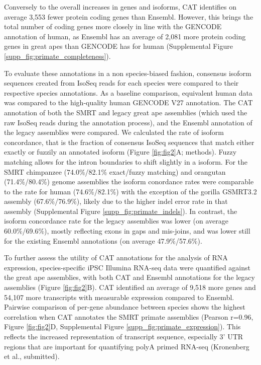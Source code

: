 \documentclass[fleqn,10pt]{wlscirep}
\begin{document}
Conversely to the overall increases in genes and isoforms, CAT identifies on average 3,553 fewer protein coding genes than Ensembl. However, this brings the total number of coding genes more closely in line with the GENCODE annotation of human, as Ensembl has an average of 2,081 more protein coding genes in great apes than GENCODE has for human (Supplemental Figure \ref{supp_fig:primate_completeness}). 

To evaluate these annotations in a non species-biased fashion, consensus isoform sequences created from IsoSeq reads for each species were compared to their respective species annotations. As a baseline comparison, equivalent human data was compared to the high-quality human GENCODE V27 annotation. The CAT annotation of both the SMRT and legacy great ape assemblies (which used the raw IsoSeq reads during the annotation process), and the Ensembl annotation of the legacy assemblies were compared. We calculated the rate of isoform concordance, that is the fraction of consensus IsoSeq sequences that match either exactly or fuzzily an annotated isoform (Figure \ref{fig:fig2}A; methods). Fuzzy matching allows for the intron boundaries to shift slightly in a isoform. For the SMRT chimpanzee (74.0\%/82.1\% exact/fuzzy matching) and orangutan (71.4\%/80.4\%) genome assemblies the isoform conordance rates were comparable to the rate for human (74.6\%/82.1\%) with the exception of the gorilla GSMRT3.2 assembly (67.6\%/76.9\%), likely due to the higher indel error rate in that assembly (Supplemental Figure \ref{supp_fig:primate_indels}). In contrast, the isoform concordance rate for the legacy assemblies was lower (on average 60.0\%/69.6\%), mostly reflecting exons in gaps and mis-joins, and was lower still for the existing Ensembl annotations (on average 47.9\%/57.6\%).

To further assess the utility of CAT annotations for the analysis of RNA expression, species-specific iPSC Illumina RNA-seq data were quantified against the great ape assemblies, with both CAT and Ensembl annotations for the legacy assemblies (Figure \ref{fig:fig2}B). CAT identified an average of 9,518 more genes and 54,107 more transcripts with measurable expression compared to Ensembl. Pairwise comparison of per-gene abundance between species shows the highest correlation when CAT annotates the SMRT primate assemblies (Pearson r=0.96, Figure \ref{fig:fig2}D, Supplemental Figure \ref{supp_fig:primate_expression}). This reflects the increased representation of transcript sequence, especially 3' UTR regions that are important for quantifying polyA primed RNA-seq (Kronenberg et al., submitted).
\end{document}
